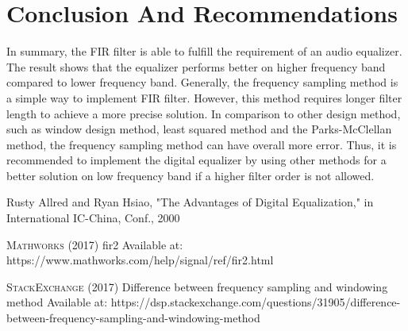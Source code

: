 \documentclass[titlepage]{article}
\begin{document}
\section{Conclusion And Recommendations}
\label{sec:org5beb6bc}
In summary, the FIR filter is able to fulfill the requirement of an audio
equalizer. The result shows that the equalizer performs better on higher
frequency band compared to lower frequency band. Generally, the frequency
sampling method is a simple way to implement FIR filter. However, this method
requires longer filter length to achieve a more precise solution. In
comparison to other design method, such as window design method, least squared
method and the Parks-McClellan method, the frequency sampling method can have
overall more error. Thus, it is recommended to implement the digital equalizer
by using other methods for a better solution on low frequency band if a higher
filter order is not allowed.


\begin{thebibliography}{5}

 Rusty Allred and Ryan Hsiao, "The Advantages of Digital Equalization," in International IC-China, Conf., 2000

\textsc{Mathworks} (2017) fir2 
\newline
[online] Available at: https://www.mathworks.com/help/signal/ref/fir2.html

\textsc{StackExchange} (2017) Difference between frequency sampling and windowing method
\newline
[online] Available at: https://dsp.stackexchange.com/questions/31905/difference-between-frequency-sampling-and-windowing-method

\end{thebibliography}
\end{document}
